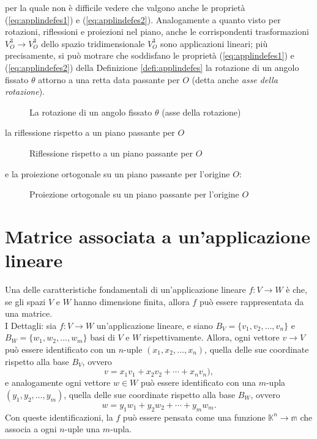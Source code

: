 \begin{es}
  per la quale non è difficile vedere che valgono anche le proprietà
  (\ref{eq:applindefes1}) e (\ref{eq:applindefes2}).
  Analogamente a quanto visto per rotazioni, riflessioni e proiezioni nel
  piano, anche le corrispondenti trasformazioni $V_O^3\to V_O^3$ dello
  spazio tridimensionale $V_O^3$ sono applicazioni lineari; più
  precisamente, si può motrare che soddisfano le proprietà
  (\ref{eq:applindefes1}) e (\ref{eq:applindefes2}) della Definizione
  \ref{defi:applindefes} la rotazione di un angolo fissato $\theta$
  attorno a una retta data passante per $O$ (detta anche \emph{asse della
    rotazione}).
  \clearpage
  \begin{figure}[ht!]
    \centering
    \resizebox{3cm}{!}{}
    \caption{La rotazione di un angolo fissato $\theta$ (asse della rotazione)}
    \label{fig:applindefes8}
  \end{figure}
  la riflessione rispetto a un piano passante per $O$
  \begin{figure}[ht!]
    \centering
    \resizebox{4cm}{!}{}
    \caption{Riflessione rispetto a un piano passante per $O$}
    \label{fig:applindefes9}
  \end{figure}
  
  e la proiezione ortogonale su un piano passante per l'origine $O$:
  \begin{figure}[ht!]
    \centering
    \resizebox{5cm}{!}{}
    \caption{Proiezione ortogonale su un piano passante per l'origine $O$}
    \label{fig:applindefes10}
  \end{figure}
\end{es}

\section{Matrice associata a un'applicazione lineare}
\label{sec:mtxAsaplin}

Una delle caratteristiche fondamentali di un'applicazione lineare
$f:V\to W$ è che, se gli spazi $V$ e $W$ hanno dimensione finita, allora
$f$ può essere rappresentata da una matrice.\\
I Dettagli: sia $f:V\to W$ un'applicazione lineare, e siano
$B_V=\{v_1,v_2,\dots,v_n\}$ e $B_W=\{w_1,w_2,\dots,w_m\}$ basi di $V$ e
$W$ rispettivamente. Allora, ogni vettore $v\to V$ può essere identificato
con un $n$-uple $(x_1,x_2,\dots,x_n)$, quella delle sue coordinate
rispetto alla base $B_V$, ovvero
\begin{equation}
  \label{eq:mtxAsaplin1}
  v=x_1v_1+x_2v_2+\cdots+x_nv_n),
\end{equation}
e analogamente ogni vettore $w\in W$ può essere identificato con una
$m$-upla $(y_1,y_2,\dots,y_m)$, quella delle sue coordinate rispetto alla
base $B_W$, ovvero
\begin{equation}
  \label{eq:mtxAsaplin2}
  w=y_1w_1+y_2w_2+\cdots+y_mw_m.
\end{equation}
Con queste identificazioni, la $f$ può essere pensata come una funzione
$\mathds{K}^n\to\mathds{m}$ che associa a ogni $n$-uple una $m$-upla.

